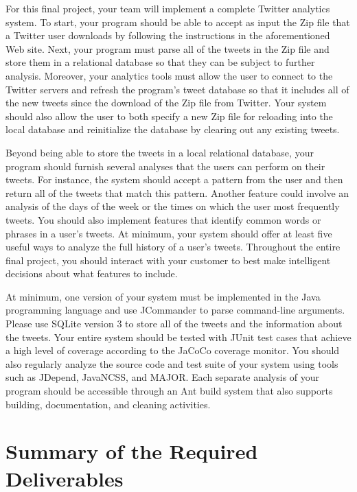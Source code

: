 For this final project, your team will implement a complete Twitter analytics system.  To start, your program should be
able to accept as input the Zip file that a Twitter user downloads by following the instructions in the aforementioned
Web site. Next, your program must parse all of the tweets in the Zip file and store them in a relational database so
that they can be subject to further analysis. Moreover, your analytics tools must allow the user to connect to the
Twitter servers and refresh the program's tweet database so that it includes all of the new tweets since the download of
the Zip file from Twitter. Your system should also allow the user to both specify a new Zip file for reloading into the
local database and reinitialize the database by clearing out any existing tweets.

Beyond being able to store the tweets in a local relational database, your program should furnish several analyses that
the users can perform on their tweets.  For instance, the system should accept a pattern from the user and then return
all of the tweets that match this pattern.  Another feature could involve an analysis of the days of the week or the
times on which the user most frequently tweets.  You should also implement features that identify common words or
phrases in a user's tweets. At minimum, your system should offer at least five useful ways to analyze the full history
of a user's tweets.  Throughout the entire final project, you should interact with your customer to best make
intelligent decisions about what features to include.

At minimum, one version of your system must be implemented in the Java programming language and use JCommander to parse
command-line arguments. Please use SQLite version 3 to store all of the tweets and the information about the tweets.
Your entire system should be tested with JUnit test cases that achieve a high level of coverage according to the JaCoCo
coverage monitor.  You should also regularly analyze the source code and test suite of your system using tools such as
JDepend, JavaNCSS, and MAJOR. Each separate analysis of your program should be accessible through an Ant build system
that also supports building, documentation, and cleaning activities.

\section*{Summary of the Required Deliverables}

